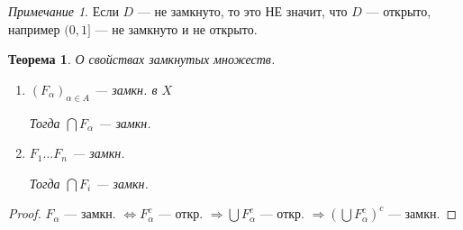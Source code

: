 \documentclass[12pt]{article}
\theoremstyle{plain}
\newtheorem{theorem}{Теорема}
\theoremstyle{remark}
\newtheorem*{remark}{Примечание}
\theoremstyle{definition}
\begin{document}
\begin{remark}
    Если $D$ --- не замкнуто, то это НЕ значит, что $D$ --- открыто, например $(0,1]$ --- не замкнуто и не открыто.
\end{remark}

\begin{theorem}
    О свойствах замкнутых множеств.

    \begin{enumerate}
        \item $(F_\alpha)_{\alpha\in A}$ --- замкн. в $X$
        
        Тогда $\bigcap F_\alpha$ --- замкн.

        \item $F_1\ldots F_n$ --- замкн.
        
        Тогда $\bigcap F_i$ --- замкн.
    \end{enumerate}
\end{theorem}

\begin{proof}
    $F_\alpha$ --- замкн. $\Leftrightarrow F_\alpha^c$ --- откр. $\Rightarrow \bigcup F_\alpha^c$ --- откр. $\Rightarrow (\bigcup F_\alpha^c)^c$ --- замкн.
\end{proof}
\end{document}
